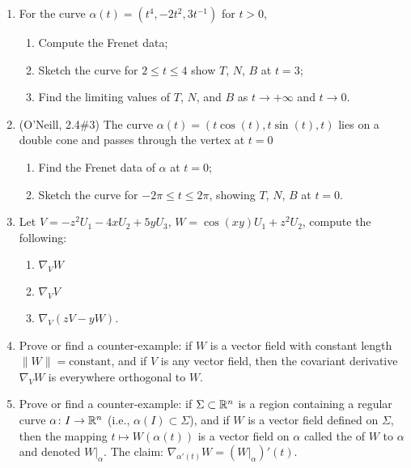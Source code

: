 \begin{enumerate}
\item For the curve $\alpha(t) = (t^{4},-2t^{2},3t^{-1})$ for $t>0$,
\begin{enumerate}
\item Compute the Frenet data;
\item Sketch the curve for $2\leq t\leq 4$ show $T$, $N$, $B$ at $t=3$;
\item Find the limiting values of $T$, $N$, and $B$ as $t\to+\infty$ and $t\to0$.
\end{enumerate}
\item (O'Neill, 2.4\#3) The curve $\alpha(t)=(t\cos(t),t\sin(t),t)$ lies on a double cone
  and passes through the vertex at $t=0$
  \begin{enumerate}
\item Find the Frenet data of $\alpha$ at $t=0$;
\item Sketch the curve for $-2\pi\leq t\leq2\pi$, showing $T$, $N$, $B$
  at $t=0$.
  \end{enumerate}
\item Let $V = -z^{2}U_{1}-4x U_{2} + 5yU_{3}$,
  $W = \cos(xy)U_{1} + z^{2}U_{2}$, compute the following:
  \begin{enumerate}
  \item $\nabla_{V}W$
  \item $\nabla_{V}V$
  \item $\nabla_{V}(zV-yW)$.
  \end{enumerate}
\item Prove or find a counter-example: if $W$ is a vector field with
  constant length $\|W\|=\mbox{constant}$, and if $V$ is any vector
  field, then the covariant derivative $\nabla_{V}W$ is everywhere
  orthogonal to $W$.
\item Prove or find a counter-example: if $\Sigma\subset\mathbb{R}^{n}$ is a
  region containing a regular curve $\alpha\colon I\to\mathbb{R}^{n}$ (i.e.,
  $\alpha(I)\subset\Sigma$), and if $W$ is a vector field defined on
  $\Sigma$, then the mapping $t\mapsto W(\alpha(t))$ is a vector field
  on $\alpha$ called the  of $W$ to $\alpha$ and
  denoted $W|_{\alpha}$. The claim: $\nabla_{\alpha'(t)}W = (W|_{\alpha})'(t)$.
\end{enumerate}